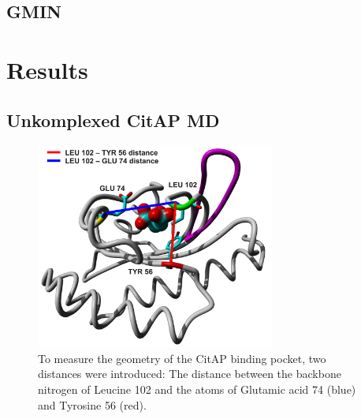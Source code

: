 \documentclass[english, a4paper, 12pt, titlepage, draft]{article}
\begin{document}
\subsection{GMIN}


\section{Results}

\subsection{Unkomplexed CitAP MD}

\begin{figure}
    \centering
    \includegraphics[width=0.7\textwidth]{figures/CitA_pocket2.pdf}
    \caption{To measure the geometry of the CitAP binding pocket, two distances were introduced: The distance between the backbone nitrogen of Leucine 102 and the  atoms of Glutamic acid 74 (blue) and Tyrosine 56 (red).}
    \label{fig:CitA_pocket}
\end{figure}        
\end{document}
